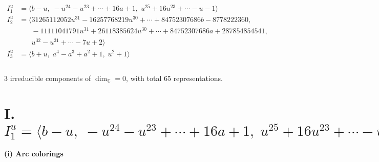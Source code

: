 \documentclass[1p]{elsarticle_modified}
\theoremstyle{definition}
\begin{document}
\begin{align*}
I^u_{1}&=\langle 
b- u,\;- u^{24}- u^{23}+\cdots+16 a+1,\;u^{25}+16 u^{23}+\cdots- u-1\rangle \\
I^u_{2}&=\langle 
31265112052 u^{31}-16257768219 u^{30}+\cdots+84752307686 b-8778222360,\\
\phantom{I^u_{2}}&\phantom{= \langle  }-11111041791 u^{31}+26118385624 u^{30}+\cdots+84752307686 a+287854854541,\\
\phantom{I^u_{2}}&\phantom{= \langle  }u^{32}- u^{31}+\cdots-7 u+2\rangle \\
I^u_{3}&=\langle 
b+u,\;a^4- a^3+a^2+1,\;u^2+1\rangle \\
\\
\end{align*}
\raggedright * 3 irreducible components of $\dim_{\mathbb{C}}=0$, with total 65 representations.\\
\newpage
\renewcommand{\arraystretch}{1}
\centering \section*{I. $I^u_{1}= \langle b- u,\;- u^{24}- u^{23}+\cdots+16 a+1,\;u^{25}+16 u^{23}+\cdots- u-1 \rangle$}
\flushleft \textbf{(i) Arc colorings}\\
\end{document}
